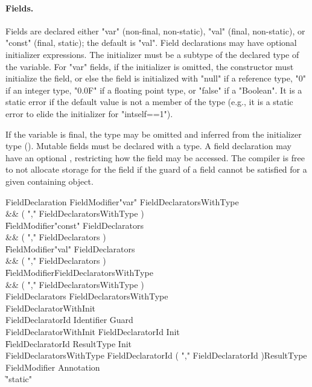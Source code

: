 \paragraph{Fields.}
Fields are declared either \xcd"var" (non-final, non-static),
\xcd"val" (final, non-static), or \xcd"const" (final, static);
the default is \xcd"val".
Field declarations may have optional
initializer expressions.  The initializer must be a subtype of
the declared type of the variable.
For \xcd"var" fields,
if the initializer is omitted, the constructor must initialize
the field, or else the field is initialized with
\xcd"null" if a reference type,
\xcd"0" if an integer type,
\xcd"0.0F" if a floating point type, or
\xcd"false" if a \xcd"Boolean".  It is a static error if the
default value is not a member of the type (e.g., it is a static
error to elide the initializer for \xcd"int{self==1}").

If the variable is final,
the type may be omitted and
inferred from the initializer type ().
Mutable fields must be declared with a type.
A field declaration may have an optional
, restricting how the field may be accessed.
The compiler is free to not allocate storage for the field if
the guard of a field cannot be satisfied for a given containing
object.

\begin{grammar}
FieldDeclaration
        \: FieldModifier\star \xcd"var" FieldDeclaratorsWithType \\&& ( \xcd"," FieldDeclaratorsWithType )\star \\
        \| FieldModifier\star \xcd"const" FieldDeclarators \\&& ( \xcd"," FieldDeclarators )\star \\
        \| FieldModifier\star \xcd"val" FieldDeclarators \\&& ( \xcd"," FieldDeclarators )\star \\
        \| FieldModifier\star FieldDeclaratorsWithType \\&& ( \xcd"," FieldDeclaratorsWithType )\star \\
FieldDeclarators
        \: FieldDeclaratorsWithType \\
        \: FieldDeclaratorWithInit \\
FieldDeclaratorId
        \: Identifier Guard\opt \\
FieldDeclaratorWithInit
        \: FieldDeclaratorId Init \\
        \| FieldDeclaratorId ResultType Init \\
FieldDeclaratorsWithType
        \: FieldDeclaratorId ( \xcd"," FieldDeclaratorId )\star ResultType \\
FieldModifier \: Annotation \\
                \| \xcd"static" \\
\end{grammar}

